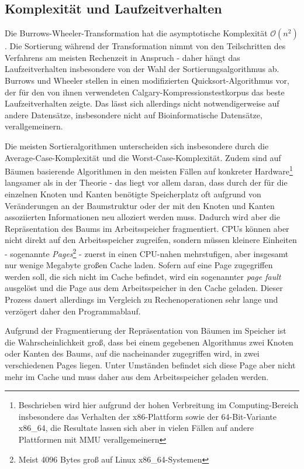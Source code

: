 \documentclass[ngerman,pdftex,paper=A4,DIV=calc,titlepage,12pt]{scrartcl}
\newtheorem[L]{boxedDefinition}{Definition}
\begin{document}
\subsection{Komplexität und Laufzeitverhalten}
Die Burrows-Wheeler-Transformation hat die asymptotische Komplexität $\mathcal{O}(n^2)$. Die Sortierung während der Transformation nimmt von den Teilschritten des Verfahrens am meisten Rechenzeit in Anspruch - daher hängt das Laufzeitverhalten insbesondere von der Wahl der Sortierungsalgorithmus ab. Burrows und Wheeler stellen in \cite{burrows1994block} einen modifizierten Quicksort-Algorithmus vor, der für den von ihnen verwendeten Calgary-Kompressionstestkorpus das beste Laufzeitverhalten zeigte. Das lässt sich allerdings nicht notwendigerweise auf andere Datensätze, insbesondere nicht auf Bioinformatische Datensätze, verallgemeinern.

Die meisten Sortieralgorithmen unterscheiden sich insbesondere durch die Average-Case-Komplexität und die Worst-Case-Komplexität. Zudem sind auf Bäumen basierende Algorithmen in den meisten Fällen auf konkreter Hardware\footnote{Beschrieben wird hier aufgrund der hohen Verbreitung im Computing-Bereich insbesondere das Verhalten der x86-Plattform sowie der 64-Bit-Variante x86\_64, die Resultate lassen sich aber in vielen Fällen auf andere Plattformen mit MMU\footnotemark{} verallgemeinern} langsamer als in der Theorie - das liegt vor allem daran, dass durch der für die einzelnen Knoten und Kanten benötigte Speicherplatz oft aufgrund von Veränderungen an der Baumstruktur oder der mit den Knoten und Kanten assoziierten Informationen neu alloziert werden muss. Dadurch wird aber die Repräsentation des Baums im Arbeitsspeicher fragmentiert. CPUs können aber nicht direkt auf den Arbeitsspeicher zugreifen, sondern müssen kleinere Einheiten - sogenannte \textit{Pages}\footnote{Meist 4096 Bytes groß auf Linux x86\_64-Systemen} - zuerst in einen CPU-nahen mehrstufigen, aber insgesamt nur wenige Megabyte großen Cache laden. Sofern auf eine Page zugegriffen werden soll, die sich nicht im Cache befindet, wird ein sogenannter \textit{page fault} ausgelöst und die Page aus dem Arbeitsspeicher in den Cache geladen. Dieser Prozess dauert allerdings im Vergleich zu Rechenoperationen sehr lange und verzögert daher den Programmablauf.

Aufgrund der Fragmentierung der Repräsentation von Bäumen im Speicher ist die Wahrscheinlichkeit groß, dass bei einem gegebenen Algorithmus zwei Knoten oder Kanten des Baums, auf die nacheinander zugegriffen wird, in zwei verschiedenen Pages liegen. Unter Umständen befindet sich diese Page aber nicht mehr im Cache und muss daher aus dem Arbeitsspeicher geladen werden. 
\end{document}
